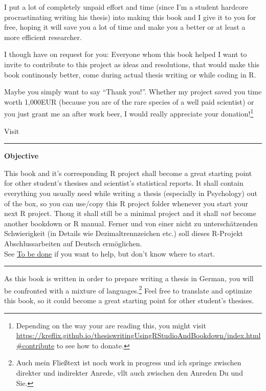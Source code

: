 \documentclass[]{book}
\let\rmarkdownfootnote\footnote%
\def\footnote{\protect\rmarkdownfootnote}
\theoremstyle{definition}
\theoremstyle{definition}
\theoremstyle{remark}
\begin{document}
I put a lot of completely unpaid effort and time (since I'm a student
hardcore procrastinating writing his thesis) into making this book and I
give it to you for free, hoping it will save you a lot of time and make
you a better or at least a more efficient researcher.

I though have on request for you: Everyone whom this book helped I want
to invite to contribute to this project as ideas and resolutions, that
would make this book continously better, come during actual thesis
writing or while coding in R.

Maybe you simply want to say ``Thank you!''. Whether my project saved
you time worth 1,000EUR (because you are of the rare species of a well
paid scientist) or you just grant me an after work beer, I would really
appreciate your donation!\footnote{Depending on the way your are reading
  this, you might visit
  \url{https://kreflix.github.io/thesiswritingUsingRStudioAndBookdown/index.html\#contribute}
  to see how to donate.}

Visit

\begin{center}\rule{0.5\linewidth}{\linethickness}\end{center}

\textbf{Objective}

This book and it's corresponding R project shall become a great starting
point for other student's thesises and scientist's statistical reports.
It shall contain everything you usually need while writing a thesis
(especially in Psychology) out of the box, so you can use/copy this R
project folder whenever you start your next R project. Thoug it shall
still be a minimal project and it shall \emph{not} become another
bookdown or R manual. Ferner und von einer nicht zu unterschätzenden
Schwierigkeit (in Details wie Dezimaltrennzeichen etc.) soll dieses
R-Projekt Abschlussarbeiten auf Deutsch ermöglichen.\\
See \protect\hyperlink{tbd}{To be done} if you want to help, but don't
know where to start.

\begin{center}\rule{0.5\linewidth}{\linethickness}\end{center}

As this book is written in order to prepare writing a thesis in German,
you will be confronted with a mixture of languages.\footnote{Auch mein
  Fließtext ist noch work in progress und ich springe zwischen direkter
  und indirekter Anrede, vllt auch zwischen den Anreden Du und Sie.}
Feel free to translate and optimize this book, so it could become a
great starting point for other student's thesises.
\end{document}
